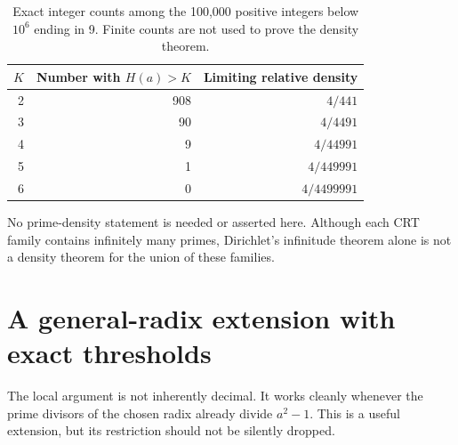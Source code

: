 \documentclass[11pt,letterpaper]{article}
\numberwithin{equation}{section}
\theoremstyle{definition}
\theoremstyle{remark}
\begin{document}
\begin{table}[htbp]
\centering
\caption{Exact integer counts among the 100,000 positive integers below $10^6$ ending in 9. Finite counts are not used to prove the density theorem.}\label{tab:density}
\begin{tabular}{rrr}
\toprule
$K$&Number with $H(a)>K$&Limiting relative density\\
\midrule
2&908&$4/441$\\
3&90&$4/4491$\\
4&9&$4/44991$\\
5&1&$4/449991$\\
6&0&$4/4499991$\\
\bottomrule
\end{tabular}
\end{table}

No prime-density statement is needed or asserted here. Although each CRT family contains infinitely many primes, Dirichlet's infinitude theorem alone is not a density theorem for the union of these families.

\section{A general-radix extension with exact thresholds}\label{sec:general-radix}

The local argument is not inherently decimal. It works cleanly whenever the prime divisors of the chosen radix already divide $a^2-1$. This is a useful extension, but its restriction should not be silently dropped.
\end{document}

